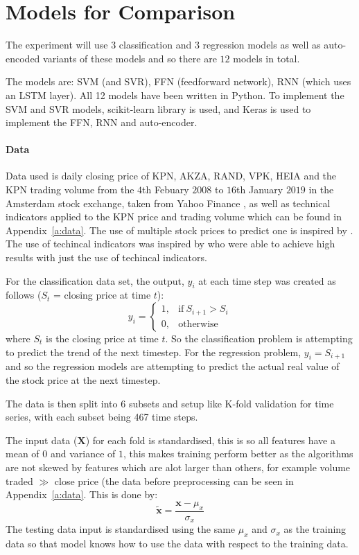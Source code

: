\documentclass[11pt,a4paper]{article}
\numberwithin{equation}{section}
\begin{document}
\section{Models for Comparison}
\label{ss:models}
The experiment will use $3$ classification and $3$ regression models as well as auto-encoded variants of these models and so there are $12$ models in total.

The models are: SVM (and SVR), FFN (feedforward network), RNN (which uses an LSTM layer). All 12 models have been written in Python. To implement the SVM and SVR models, scikit-learn library \cite{sklearn} is used, and Keras \cite{keras} is used to implement the FFN, RNN and auto-encoder.

\paragraph{Data}
\label{ss:data}
Data used is daily closing price of KPN, AKZA, RAND, VPK, HEIA and the KPN trading volume from the $4$th Febuary $2008$ to $16$th January $2019$ in the Amsterdam stock exchange, taken from Yahoo Finance \cite{kpn}, as well as technical indicators applied to the KPN price and trading volume which can be found in Appendix~\ref{a:data}. The use of multiple stock prices to predict one is inspired by \cite{siri2018}. The use of techincal indicators was inspired by \cite{kim2003, qian2017} who were able to achieve high results with just the use of techincal indicators.

For the classification data set, the output, $y_{i}$ at each time step was created as follows ($S_{t}$ = closing price at time $t$):
\[
y_{i} =
    \begin{cases}
      1, & \text{if}\ S_{i+1} > S_{i} \\
      0, & \text{otherwise}
    \end{cases}
\]
where $S_{t}$ is the closing price at time $t$. So the classification problem is attempting to predict the trend of the next timestep. For the regression problem, $y_{i} = S_{i+1}$ and so the regression models are attempting to predict the actual real value of the stock price at the next timestep.

The data is then split into $6$ subsets and setup like K-fold validation for time series, with each subset being 467 time steps.

The input data ($\mathbf{X}$) for each fold is standardised, this is so all features have a mean of $0$ and variance of $1$, this makes training perform better as the algorithms are not skewed by features which are alot larger than others, for example volume traded $\gg$ close price (the data before preprocessing can be seen in Appendix~\ref{a:data}. This is done by:
\[
\tilde{\mathbf{x}} = \frac{\mathbf{x} - \mu_{x}}{\sigma_{x}}
\]
The testing data input is standardised using the same $\mu_{x}$ and $\sigma_{x}$ as the training data so that model knows how to use the data with respect to the training data.
\end{document}
